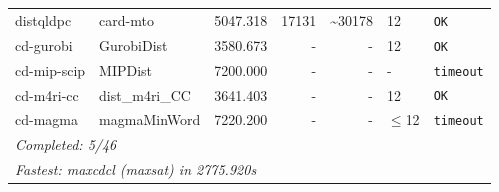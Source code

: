 \begin{longtable}{llrrrl p{}}
distqldpc & card-mto & 5047.318 & 17131 & \textasciitilde{}30178 & 12 & \texttt{OK} \\
cd-gurobi & GurobiDist & 3580.673 & - & - & 12 & \texttt{OK} \\
cd-mip-scip & MIPDist & 7200.000 & - & - & - & \texttt{timeout} \\
cd-m4ri-cc & dist\_m4ri\_CC & 3641.403 & - & - & 12 & \texttt{OK} \\
cd-magma & magmaMinWord & 7220.200 & - & - & $\leq$12 & \texttt{timeout} \\
\midrule
\multicolumn{7}{l}{\textit{Completed: 5/46}} \\
\multicolumn{7}{l}{\textit{Fastest: maxcdcl (maxsat) in 2775.920s}} \\
\end{longtable}
